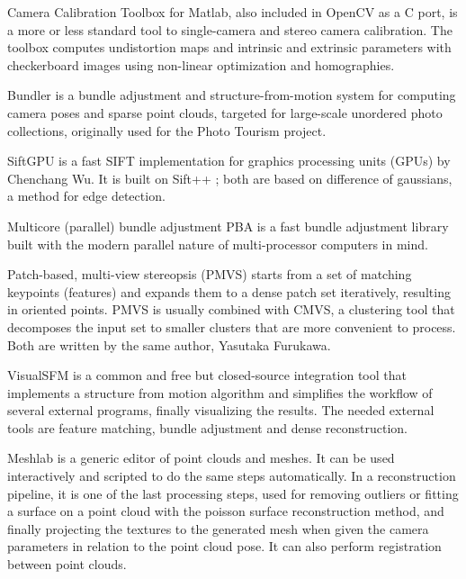 Camera Calibration Toolbox for Matlab, also included in OpenCV as a C port, is a more or less standard tool to single-camera and stereo camera calibration.
The toolbox computes undistortion maps and intrinsic and extrinsic parameters with checkerboard images using non-linear optimization and homographies. \cite{camcalmatlab}

Bundler is a bundle adjustment and structure-from-motion system for computing camera poses and sparse point clouds, targeted for large-scale unordered photo collections, originally used for the Photo Tourism project. \cite{snavely2006photo}

SiftGPU is a fast SIFT implementation for graphics processing units (GPUs) by Chenchang Wu. \cite{changchang2007siftgpu}
It is built on Sift++ \cite{vedaldi2011sift++}; both are based on difference of gaussians, a method for edge detection. \cite{marr1980theory}

Multicore (parallel) bundle adjustment PBA is a fast bundle adjustment library built with the modern parallel nature of multi-processor computers in mind. \cite{wu2011multicore}

Patch-based, multi-view stereopsis (PMVS) starts from a set of matching keypoints (features) and expands them to a dense patch set iteratively, resulting in oriented points.
PMVS is usually combined with CMVS, a clustering tool that decomposes the input set to smaller clusters that are more convenient to process.
Both are written by the same author, Yasutaka Furukawa. \cite{furukawa2010accurate,furukawa2012patch}

VisualSFM \cite{wu2013towards} is a common and free but closed-source integration tool that implements a structure from motion algorithm and simplifies the workflow of several external programs, finally visualizing the results.
The needed external tools are feature matching, bundle adjustment and dense reconstruction.

Meshlab \cite{meshlab} is a generic editor of point clouds and meshes.
It can be used interactively and scripted to do the same steps automatically.
In a reconstruction pipeline, it is one of the last processing steps, used for removing outliers or fitting a surface on a point cloud with the poisson surface reconstruction method, and finally projecting the textures to the generated mesh when given the camera parameters in relation to the point cloud pose.
It can also perform registration between point clouds.

